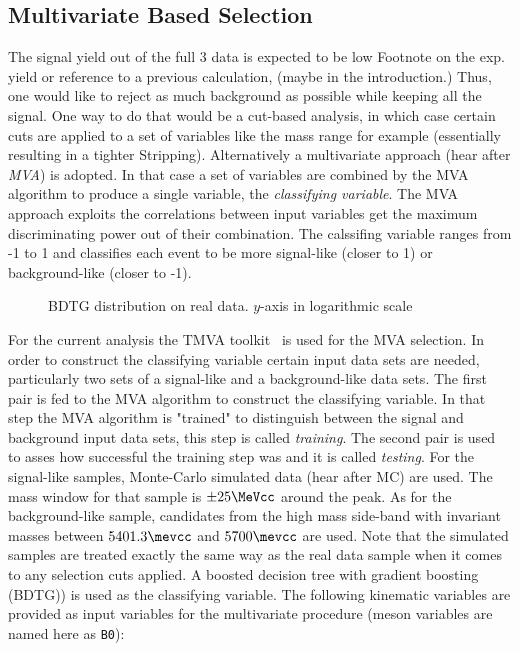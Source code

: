 

\subsection{Multivariate Based Selection}
\label{Multivariate_Based_Selection}

The \BsJpsiKst signal yield out of the full 3 \invfb data is expected to be low {\color{red} Footnote on the exp. yield or reference to a 
previous calculation, (maybe in the introduction.)} Thus, one would like to reject as much background as possible while keeping all the signal. 
One way to do that would be a cut-based analysis, in which case certain cuts are applied to a set of variables like the \Bs 
mass range for example (essentially resulting in a tighter Stripping). Alternatively a multivariate approach (hear after {\it MVA}) is adopted. 
In that case a set of variables are combined by the MVA algorithm to produce a single variable, the {\it classifying variable}. 
The MVA approach exploits the correlations between input variables get the maximum discriminating power out of their combination.
The calssifing variable ranges from -1 to 1 and classifies each event to be more signal-like (closer to 1) or background-like (closer to -1). 

\begin{figure}[h]
\begin{center}
  \scalebox{1}{}
  \caption{BDTG distribution on real data. $y$-axis in logarithmic scale}
  \label{BTDG_performance}
\end{center}
\end{figure}

For the current analysis the TMVA toolkit~\cite{TMVA} is used for the MVA selection. In order to construct the classifying variable certain 
input data sets are needed, particularly two sets of a signal-like and a background-like data sets. The first pair is fed to the MVA algorithm 
to construct the classifying variable. In that step the MVA algorithm is "trained" to distinguish between the signal and background input data sets,
this step is called {\it training}. The second pair is used to asses how successful the training step was and it is called {\it testing}. 
For the signal-like samples, \BsJpsiKst Monte-Carlo simulated data (hear after MC)
are used. The \Bs mass window for that sample is $\pm 25 \MeVcc$ around the \Bs peak. As for the background-like sample, candidates from the high mass side-band
with invariant masses between $5401.3\mevcc$ and $5700\mevcc$ are used. Note that the simulated samples are treated exactly the same way as the
real data sample when it comes to any selection cuts applied. A boosted decision tree with gradient boosting (BDTG){\color{red}{what is gradient boosting})}
is used as the classifying variable. The following kinematic variables are provided as input variables for the multivariate procedure (\Bs meson variables are 
named here as \texttt{B0}):

